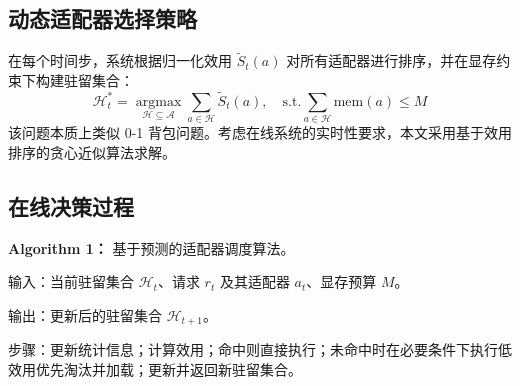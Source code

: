 \subsection{动态适配器选择策略}
在每个时间步，系统根据归一化效用 $\tilde{S}_t(a)$ 对所有适配器进行排序，并在显存约束下构建驻留集合：
\begin{equation}
\mathcal{H}_t^*=\underset{\mathcal{H}\subseteq\mathcal{A}}{\operatorname{argmax}}\sum_{a\in\mathcal{H}}\tilde{S}_t(a),\quad \text{s.t.}\sum_{a\in\mathcal{H}}\mathrm{mem}(a)\le M
\end{equation}
该问题本质上类似 0-1 背包问题。考虑在线系统的实时性要求，本文采用基于效用排序的贪心近似算法求解。

\subsection{在线决策过程}
\textbf{Algorithm 1：} 基于预测的适配器调度算法。\par
输入：当前驻留集合 $\mathcal{H}_t$、请求 $r_t$ 及其适配器 $a_t$、显存预算 $M$。\par
输出：更新后的驻留集合 $\mathcal{H}_{t+1}$。\par
步骤：更新统计信息；计算效用；命中则直接执行；未命中时在必要条件下执行低效用优先淘汰并加载；更新并返回新驻留集合。
